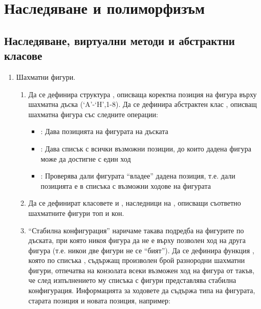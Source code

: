 \clearpage\section {Наследяване и полиморфизъм}

\subsection {Наследяване, виртуални методи и абстрактни класове}

\begin{enumerate}


    \item \label{zad:gamechess}Шахматни фигури.

    \begin{enumerate}[label=\alph*)]
      \item Да се дефинира структура , описваща коректна позиция на фигура върху шахматна дъска (‘A’-‘H’,1-8). Да се дефинира абстрактен клас , описващ шахматна фигура със следните операции:

      \begin{itemize}
      \item {}: Дава позицията на фигурата на дъската
      \item {}: Дава списък с всички възможни позиции, до които дадена фигура може да достигне с един ход
      \item {}: Проверява дали фигурата ``владее'' дадена позиция, т.е. дали позицията е в списъка с възможни ходове на фигурата
      \end{itemize}

      \item Да се дефинират класовете  и , наследници на , описващи съответно шахматните фигури топ и кон.

      \item ``Стабилна конфигурация'' наричаме такава подредба на фигурите по дъската, при която никоя фигура да не е върху позволен ход на друга фигура (т.е. никои две фигури не се ``бият''). Да се дефинира функция , която по списъка , съдържащ произволен брой разнородни шахматни фигури, отпечатва на конзолата всеки възможен ход на фигура от  такъв, че след изпълнението му списъка с фигури представлява стабилна конфигурация. Информацията за ходовете да съдържа типа на фигурата, старата позиция и новата позиция, например:


\end{enumerate}
\end{enumerate}
